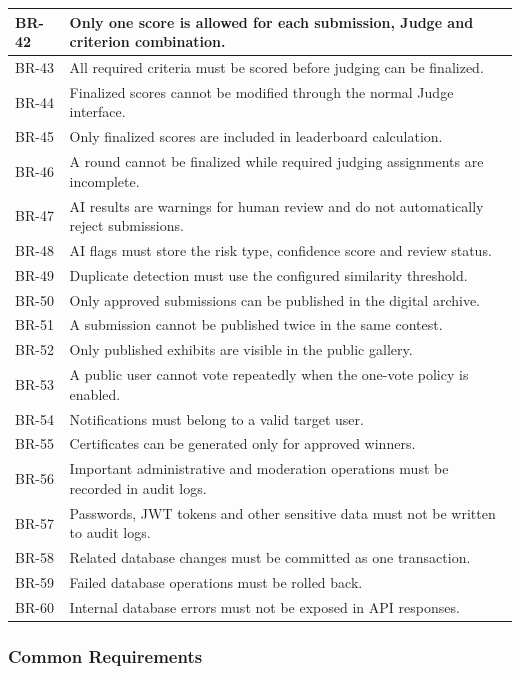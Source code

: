 \begin{longtable}{|>{\centering\arraybackslash}p{}|>{\raggedright\arraybackslash}p{}|}
\hline
BR-42 & Only one score is allowed for each submission, Judge and criterion combination. \\
\hline
BR-43 & All required criteria must be scored before judging can be finalized. \\
\hline
BR-44 & Finalized scores cannot be modified through the normal Judge interface. \\
\hline
BR-45 & Only finalized scores are included in leaderboard calculation. \\
\hline
BR-46 & A round cannot be finalized while required judging assignments are incomplete. \\
\hline
BR-47 & AI results are warnings for human review and do not automatically reject submissions. \\
\hline
BR-48 & AI flags must store the risk type, confidence score and review status. \\
\hline
BR-49 & Duplicate detection must use the configured similarity threshold. \\
\hline
BR-50 & Only approved submissions can be published in the digital archive. \\
\hline
BR-51 & A submission cannot be published twice in the same contest. \\
\hline
BR-52 & Only published exhibits are visible in the public gallery. \\
\hline
BR-53 & A public user cannot vote repeatedly when the one-vote policy is enabled. \\
\hline
BR-54 & Notifications must belong to a valid target user. \\
\hline
BR-55 & Certificates can be generated only for approved winners. \\
\hline
BR-56 & Important administrative and moderation operations must be recorded in audit logs. \\
\hline
BR-57 & Passwords, JWT tokens and other sensitive data must not be written to audit logs. \\
\hline
BR-58 & Related database changes must be committed as one transaction. \\
\hline
BR-59 & Failed database operations must be rolled back. \\
\hline
BR-60 & Internal database errors must not be exposed in API responses. \\
\hline
\end{longtable}

\subsubsection{Common Requirements}
\label{subsubsec:common-requirements}


